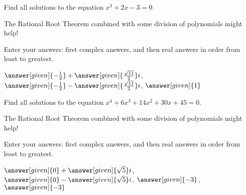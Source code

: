\documentclass[nooutcomes]{ximera}
\begin{document}
\begin{problem}
Find all solutions to the equation $x^3+2x-3=0$. 
\begin{hint} 
The Rational Root Theorem combined with some division of polynomials might help!
\end{hint}
Enter your answers: first complex answers, and then real answers in order from least to greatest.

\begin{prompt}
$\answer[given]{-\frac{1}{2}} + \answer[given]{\frac{\sqrt{11}}{2}}i$, $\answer[given]{-\frac{1}{2}} - \answer[given]{\frac{\sqrt{11}}{2}}i$, $\answer[given]{1}$
\end{prompt}
\end{problem}


\begin{problem}
Find all solutions to the equation $x^4+6x^3+14x^2+30x+45=0$. 
\begin{hint} 
The Rational Root Theorem combined with some division of polynomials might help!
\end{hint}
Enter your answers: first complex answers, and then real answers in order from least to greatest.

\begin{prompt}
$\answer[given]{0} + \answer[given]{\sqrt{5}}i$, $\answer[given]{0} - \answer[given]{\sqrt{5}}i$, $\answer[given]{-3}$, $\answer[given]{-3}$
\end{prompt}
\end{problem}
\end{document}

